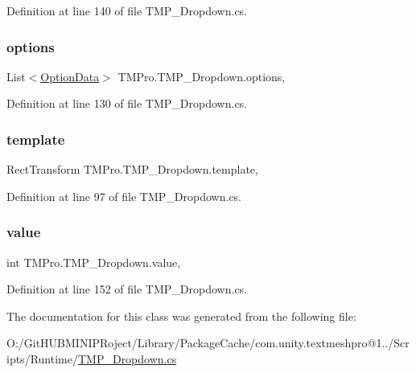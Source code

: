 Definition at line 140 of file T\+M\+P\+\_\+\+Dropdown.\+cs.

\mbox{\label{class_t_m_pro_1_1_t_m_p___dropdown_a43e1c79bd6e32dd4546a6987d684bbb6}} 
\subsubsection{\texorpdfstring{options}{options}}
{\footnotesize\ttfamily List$<$\mbox{\hyperlink{class_t_m_pro_1_1_t_m_p___dropdown_1_1_option_data}{Option\+Data}}$>$ T\+M\+Pro.\+T\+M\+P\+\_\+\+Dropdown.\+options\hspace{0.3cm}{\ttfamily [get]}, {\ttfamily [set]}}



Definition at line 130 of file T\+M\+P\+\_\+\+Dropdown.\+cs.

\mbox{\label{class_t_m_pro_1_1_t_m_p___dropdown_a6ab2bc63f80032f0d78d195fac730d5f}} 
\subsubsection{\texorpdfstring{template}{template}}
{\footnotesize\ttfamily Rect\+Transform T\+M\+Pro.\+T\+M\+P\+\_\+\+Dropdown.\+template\hspace{0.3cm}{\ttfamily [get]}, {\ttfamily [set]}}



Definition at line 97 of file T\+M\+P\+\_\+\+Dropdown.\+cs.

\mbox{\label{class_t_m_pro_1_1_t_m_p___dropdown_a0e886902a8de21487e23342580d68728}} 
\subsubsection{\texorpdfstring{value}{value}}
{\footnotesize\ttfamily int T\+M\+Pro.\+T\+M\+P\+\_\+\+Dropdown.\+value\hspace{0.3cm}{\ttfamily [get]}, {\ttfamily [set]}}



Definition at line 152 of file T\+M\+P\+\_\+\+Dropdown.\+cs.



The documentation for this class was generated from the following file\+:\begin{DoxyCompactItemize}
\item 
O\+:/\+Git\+H\+U\+B\+M\+I\+N\+I\+P\+Roject/\+Library/\+Package\+Cache/com.\+unity.\+textmeshpro@1../\+Scripts/\+Runtime/\mbox{\hyperlink{_t_m_p___dropdown_8cs}{T\+M\+P\+\_\+\+Dropdown.\+cs}}\end{DoxyCompactItemize}
